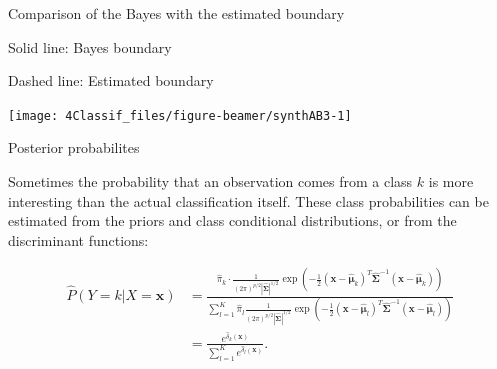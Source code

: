 \documentclass[10pt,ignorenonframetext,]{beamer}
\begin{document}
\begin{frame}

\begin{block}{Comparison of the Bayes with the estimated boundary}

\vspace{2mm}

Solid line: Bayes boundary

Dashed line: Estimated boundary

\begin{center}\texttt{[image: 4Classif\_files/figure-beamer/synthAB3-1]} \end{center}

\end{block}

\end{frame}

\begin{frame}

\begin{block}{Posterior probabilites}

\vspace{2mm}

Sometimes the probability that an observation comes from a class \(k\)
is more interesting than the actual classification itself. These class
probabilities can be estimated from the priors and class conditional
distributions, or from the discriminant functions:

\begin{align*}\hat{P}(Y=k | X=\boldsymbol{x})&=
\frac{\hat{\pi}_k \cdot \frac{1}{(2 \pi)^{p/2}|\hat{\boldsymbol{\Sigma}}|^{1/2}} \exp(-\frac{1}{2}
(\boldsymbol{x}-\hat{\boldsymbol\mu}_k)^T \hat{\boldsymbol{\Sigma}}^{-1}
(\boldsymbol{x}-\hat{\boldsymbol\mu}_k))}
{\sum_{l=1}^K \hat{\pi}_l 
\frac{1}{(2 \pi)^{p/2}|\hat{\boldsymbol{\Sigma}}|^{1/2}}
\exp(-\frac{1}{2}
(\boldsymbol{x}-\hat{\boldsymbol\mu}_l)^T 
\hat{\boldsymbol{\Sigma}}^{-1}
(\boldsymbol{x}-\hat{\boldsymbol\mu}_l))}\\
&=
\frac{e^{\hat{\delta}_k(\boldsymbol{x})}}{\sum_{l=1}^K e^{\hat{\delta}_l(\boldsymbol{x})}}.\end{align*}

\end{block}

\end{frame}
\end{document}
